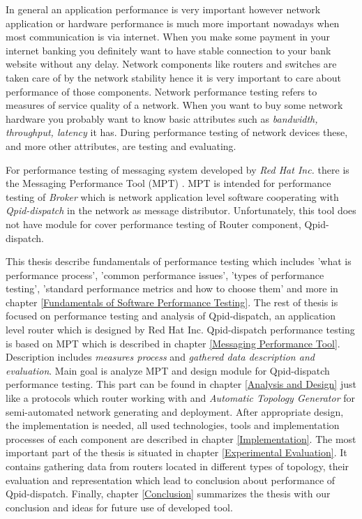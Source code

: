 In general an application performance is very important however network application or hardware performance is much more important nowadays when most communication is via internet.  When you make some payment in your internet banking you definitely want to have stable connection to your bank website without any delay. Network components like routers and switches are taken care of by the network stability hence it is very important to care about performance of those components. Network performance testing refers to measures of service quality of a network. When you want to buy some network hardware you probably want to know basic attributes such as \emph{bandwidth, throughput, latency} it has. During performance testing of network devices these, and more other attributes, are testing and evaluating. 

For performance testing of messaging system developed by \emph{Red Hat Inc.} there is the Messaging Performance Tool (MPT) \cite{ORPISKE:MSGPT}. MPT is intended for performance testing of \emph{Broker} \cite{RH:Broker} which is network application level software cooperating with \emph{Qpid-dispatch} \cite{RH:Interconnect} in the network as message distributor. Unfortunately, this tool does not have module for cover performance testing of Router component, Qpid-dispatch. 

This thesis describe fundamentals of performance testing which includes 'what is performance process', 'common performance issues', 'types of performance testing', 'standard performance metrics and how to choose them' and more in chapter \ref{Fundamentals of Software Performance Testing}. The rest of thesis is focused on performance testing and analysis of Qpid-dispatch, an application level router which is designed by Red Hat Inc. Qpid-dispatch performance testing is based on MPT which is described in chapter \ref{Messaging Performance Tool}. Description includes \emph{measures process} and \emph{gathered data description and evaluation}. Main goal is analyze MPT and design module for Qpid-dispatch performance testing. This part can be found in chapter \ref{Analysis and Design} just like a protocols which router working with and \emph{Automatic Topology Generator} for semi-automated network generating and deployment. After appropriate design, the implementation is needed, all used technologies, tools and  implementation processes of each component are described in chapter \ref{Implementation}. The most important part of the thesis is situated in chapter \ref{Experimental Evaluation}. It contains gathering data from routers located in different types of topology, their evaluation and representation which lead to conclusion about performance of Qpid-dispatch. Finally, chapter \ref{Conclusion} summarizes the thesis with our conclusion  and ideas for future use of developed tool.

